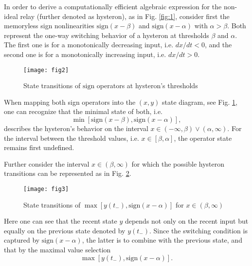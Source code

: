 \documentclass[journal]{IEEEtran}
\begin{document}
In order to derive a computationally efficient algebraic
expression for the non-ideal relay (further denoted as hysteron),
as in Fig. \ref{fig:1}, consider first the memoryless sign
nonlinearities $\mathrm{sign}(x-\beta)$ and
$\mathrm{sign}(x-\alpha)$ with $\alpha
> \beta$. Both represent the one-way switching behavior of a
hysteron at thresholds $\beta$ and $\alpha$. The first one is for
a monotonically decreasing input, i.e. $dx/dt < 0$, and the second
one is for a monotonically increasing input, i.e. $dx/dt >0$.
\begin{figure}[!h]
\centering
\texttt{[image: fig2]}
\caption{State transitions of $\mathrm{sign}$ operators at
hysteron's thresholds} \label{fig:2}
\end{figure}
When mapping both sign operators into the $(x, y)$ state diagram,
see Fig. \ref{fig:2}, one can recognize that the minimal state of
both, i.e.
$$
\min\left[\mathrm{sign}(x-\beta), \mathrm{sign}(x-\alpha)\right],
$$
describes the hysteron's behavior on the interval $x \in (-\infty,
\beta) \vee (\alpha, \infty)$. For the interval between the
threshold values, i.e. $ x \in [\beta, \alpha]$, the operator
state remains first undefined.

Further consider the interval $ x\in (\beta, \infty)$ for which
the possible hysteron transitions can be represented as in Fig.
\ref{fig:3}.
\begin{figure}[!h]
\centering
\texttt{[image: fig3]}
\caption{State transitions of $\max \left[y(t_{-}),
\mathrm{sign}(x-\alpha) \right]$ for $x \in (\beta,\infty)$}
\label{fig:3}
\end{figure}
Here one can see that the recent state $y$ depends not only on the
recent input but equally on the previous state denoted by
$y(t_{-})$. Since the switching condition is captured by
$\mathrm{sign}(x-\alpha)$, the latter is to combine with the
previous state, and that by the maximal value selection
\begin{equation}\label{3}
\max\left[y(t_{-}), \mathrm{sign} (x-\alpha)\right].
\end{equation}
\end{document}
